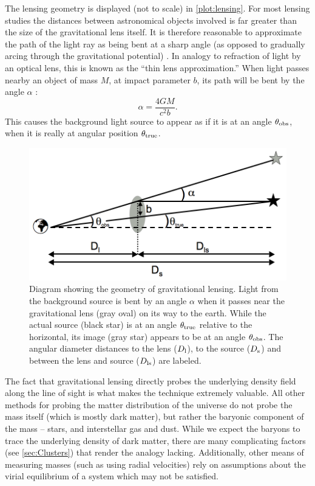 The lensing geometry is displayed (not to scale) in \autoref{plot:lensing}. For most lensing studies the distances between astronomical objects involved is far greater than the size of the gravitational lens itself. It is therefore reasonable to approximate the path of the light ray as being bent at a sharp angle (as opposed to gradually arcing through the gravitational potential) \citep{BS01}. In analogy to refraction of light by an optical lens, this is known as the ``thin lens approximation.'' When light passes nearby an object of mass $M$, at impact parameter $b$, its path will be bent by the angle $\alpha$ \citep{RydenText}:
\begin{equation}
\alpha = \frac{4GM}{c^2 b}.
\end{equation}
This causes the background light source to appear as if it is at an angle $\theta_{\rm obs}$, when it is really at angular position $\theta_{\rm true}$.

\begin{figure}
\begin{center}
\includegraphics[scale=0.5]{plots_intro/LensDiagram.png}
\caption[Gravitational Lensing Diagram]{Diagram showing the geometry of gravitational lensing. Light from the background source is bent by an angle $\alpha$ when it passes near the gravitational lens (gray oval) on its way to the earth. While the actual source (black star) is at an angle $\theta_{\rm true}$ relative to the horizontal, its image (gray star) appears to be at an angle $\theta_{\rm obs}$. The angular diameter distances to the lens ($D_{\rm l}$), to the source ($D_{\rm s}$) and between the lens and source ($D_{\rm ls}$) are labeled.}
\label{plot:lensing}
\end{center}
\end{figure}

The fact that gravitational lensing directly probes the underlying density field along the line of sight is what makes the technique extremely valuable. All other methods for probing the matter distribution of the universe do not probe the mass itself (which is mostly dark matter), but rather the baryonic component of the mass -- stars, and interstellar gas and dust. While we expect the baryons to trace the underlying density of dark matter, there are many complicating factors (see \autoref{sec:Clusters}) that render the analogy lacking. Additionally, other means of measuring masses (such as using radial velocities) rely on assumptions about the virial equilibrium of a system which may not be satisfied.

